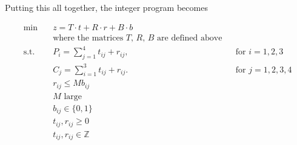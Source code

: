 \documentclass{homework}
\newcommand{\st}{\mathrm{s.t.}}
\newcommand{\bolditem}[1][YYY]{\item[\textbf{#1}]}
\begin{document}
\begin{enumerate}
		Putting this all together, the integer program becomes \begin{tcolorbox}
			\vspace{-1em}
			\begin{align*}
				\min \quad & z = T \cdot t + R \cdot r + B \cdot b \\
					& \text{where the matrices $T$, $R$, $B$ are defined above} \\
				\st \quad & P_i = \sum_{j=1}^4 t_{ij} + r_{ij}, && \text{for $i=1, 2, 3$}\\
					& C_j = \sum_{i=1}^3 t_{ij} + r_{ij}. && \text{for $j=1, 2, 3, 4$} \\
					& r_{ij} \le M b_{ij}\\
					& M \text{ large} \\
					& b_{ij} \in  \{ 0, 1\} \\
					& t_{ij}, r_{ij} \ge 0 \\
					& t_{ij}, r_{ij} \in \mathbb{Z}
			\end{align*}	
		\end{tcolorbox}

\end{enumerate}
\end{document}
